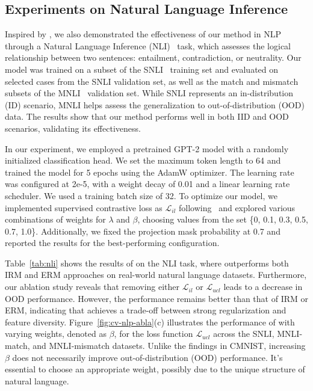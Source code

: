 \subsection{Experiments on Natural Language Inference}
\label{sec: nlp exp}

% 
Inspired by \citet{qin2024large}, we also demonstrated the effectiveness of our method in NLP through a Natural Language Inference (NLI)~\citep{NLI} task, which assesses the logical relationship between two sentences: entailment, contradiction, or neutrality. 
Our model was trained on a subset of the SNLI~\citep{SNLI} training set and evaluated on selected cases from the SNLI validation set, as well as the match and mismatch subsets of the MNLI~\citep{MNLI} validation set. 
While SNLI represents an in-distribution (ID) scenario, MNLI helps assess the generalization to out-of-distribution (OOD) data. 
The results show that our method performs well in both IID and OOD scenarios, validating its effectiveness.

In our experiment, we employed a pretrained GPT-2 model with a randomly initialized classification head. We set the maximum token length to 64 and trained the model for 5 epochs using the AdamW optimizer. The learning rate was configured at 2e-5, with a weight decay of 0.01 and a linear learning rate scheduler. We used a training batch size of 32.
To optimize our model, we implemented supervised contrastive loss as \( \mathcal{L}_{il} \) following~\cite{cnc} and explored various combinations of weights for \( \lambda \) and \( \beta \), choosing values from the set \{0, 0.1, 0.3, 0.5, 0.7, 1.0\}. Additionally, we fixed the projection mask probability at 0.7 and reported the results for the best-performing configuration.

Table~\ref{tab:nli} shows the results of \ours on the NLI task, where \ours outperforms both IRM and ERM approaches on real-world natural language datasets. 
Furthermore, our ablation study reveals that removing either $\mathcal{L}_{il}$ or $\mathcal{L}_{ucl}$ leads to a decrease in OOD performance.
However, the performance remains better than that of IRM or ERM, indicating that \ours achieves a trade-off between strong regularization and feature diversity.  
Figure~\ref{fig:cv-nlp-abla}(c) illustrates the performance of \ours with varying weights, denoted as $\beta$, for the loss function $\mathcal{L}_{ucl}$ across the SNLI, MNLI-match, and MNLI-mismatch datasets. Unlike the findings in CMNIST, increasing $\beta$ does not necessarily improve out-of-distribution (OOD) performance. 
It’s essential to choose an appropriate weight, possibly due to the unique structure of natural language.

